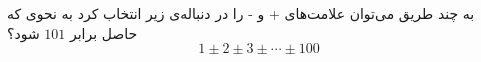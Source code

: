 \EXERCISE
به چند طریق می‌توان علامت‌های + و - را در دنباله‌ی زیر انتخاب کرد به نحوی که حاصل برابر
$101$
شود؟
$$1 \pm 2 \pm 3 \pm \cdots \pm 100$$